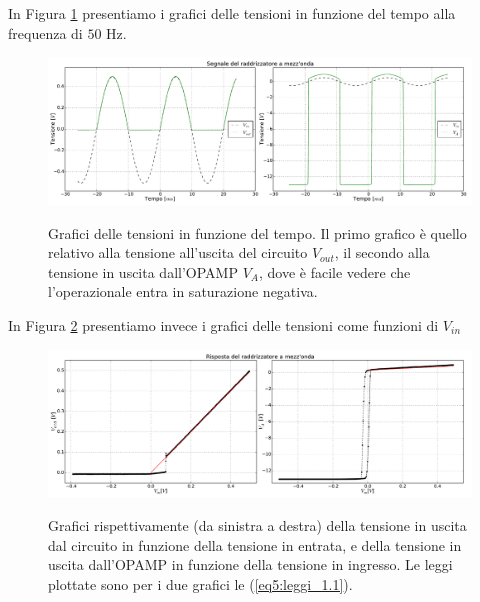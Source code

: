 In Figura \ref{gr5:primo_raddrizzatore} presentiamo i grafici delle tensioni in funzione del tempo alla frequenza di $50$ \si{\hertz}.

\begin{figure}[ht]
 \centering
   {\includegraphics[width=19.5cm]{../E05/latex/unite_tempo.pdf}}
 \caption{Grafici delle tensioni in funzione del tempo. Il primo grafico è quello relativo alla tensione all'uscita del circuito $V_{out}$, il secondo alla tensione in uscita dall'OPAMP $V_A$, dove è facile vedere che l'operazionale entra in saturazione negativa.}
 \label{gr5:primo_raddrizzatore}
\end{figure}

In Figura \ref{gr5:primo_raddrizzatore_vin} presentiamo invece i grafici delle tensioni come funzioni di $V_{in}$

\begin{figure}[ht]
 \centering
   {\includegraphics[width=19.5cm]{../E05/latex/u_risposta.pdf}}
 \caption{Grafici rispettivamente (da sinistra a destra) della tensione in uscita dal circuito in funzione della tensione in entrata, e della tensione in uscita dall'OPAMP in funzione della tensione in ingresso. Le leggi plottate sono per i due grafici le (\ref{eq5:leggi_1.1}).}
 \label{gr5:primo_raddrizzatore_vin}
\end{figure}

